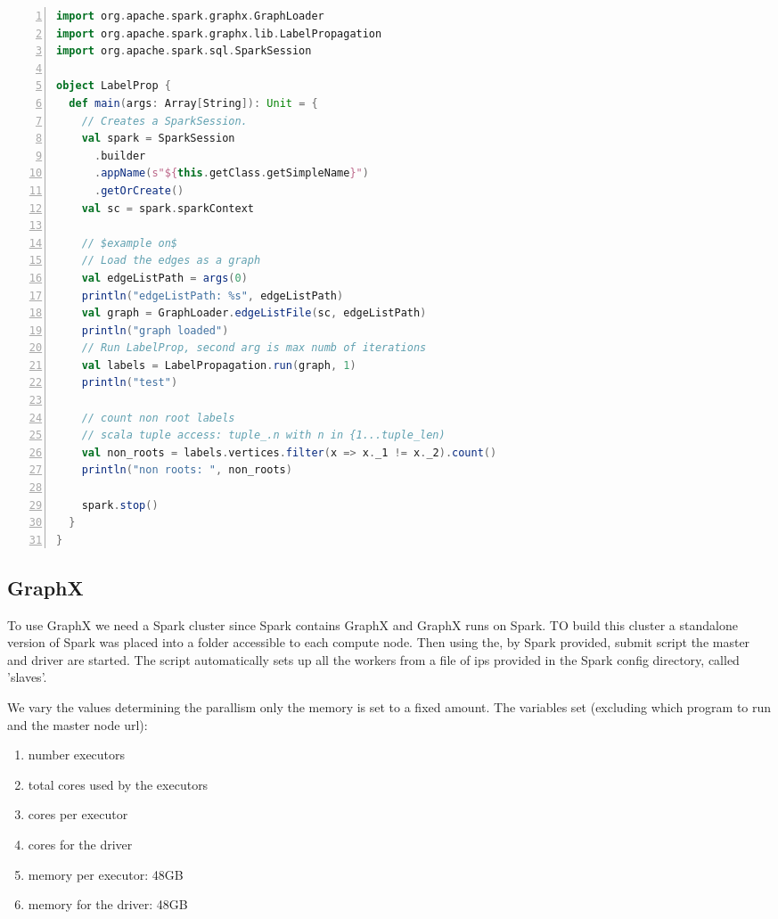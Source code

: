 \begin{lstlisting}[caption={Scala Label Propagation for spark},language=Scala,numbers=left,breaklines=true, label={labelprop}]
import org.apache.spark.graphx.GraphLoader
import org.apache.spark.graphx.lib.LabelPropagation
import org.apache.spark.sql.SparkSession

object LabelProp {
  def main(args: Array[String]): Unit = {
    // Creates a SparkSession.
    val spark = SparkSession
      .builder
      .appName(s"${this.getClass.getSimpleName}")
      .getOrCreate()
    val sc = spark.sparkContext
 
    // $example on$
    // Load the edges as a graph
    val edgeListPath = args(0)
    println("edgeListPath: %s", edgeListPath)
    val graph = GraphLoader.edgeListFile(sc, edgeListPath)
    println("graph loaded")
    // Run LabelProp, second arg is max numb of iterations
    val labels = LabelPropagation.run(graph, 1)
    println("test")

    // count non root labels
    // scala tuple access: tuple_.n with n in {1...tuple_len)
    val non_roots = labels.vertices.filter(x => x._1 != x._2).count()
    println("non roots: ", non_roots)

    spark.stop()
  }
}
\end{lstlisting}

\subsection{GraphX}
To use GraphX we need a Spark cluster since Spark contains GraphX and GraphX runs on Spark. TO build this cluster a standalone version of Spark was placed into a folder accessible to each compute node. Then using the, by Spark provided, submit script the master and driver are started. The script automatically sets up all the workers from a file of ips provided in the Spark config directory, called 'slaves'.

We vary the values determining the parallism only the memory is set to a fixed amount. The variables set (excluding which program to run and the master node url):

\begin{multicols}{2}
\begin{enumerate}
	\item number executors
	\item total cores used by the executors
	\item cores per executor
	\item cores for the driver
	\item memory per executor: 48GB
	\item memory for the driver: 48GB
\end{enumerate}
\end{multicols}

